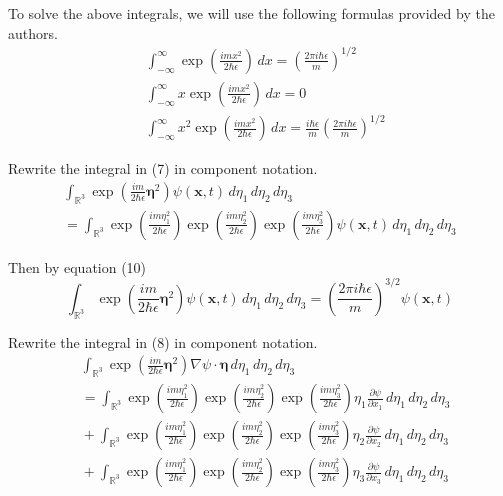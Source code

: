 To solve the above integrals, we will use the following formulas provided by the authors.
\begin{align*}
&\int_{-\infty}^\infty\exp\left(\frac{imx^2}{2\hbar\epsilon}\right)\,dx
=\left(\frac{2\pi i\hbar\epsilon}{m}\right)^{1/2}
\tag{10}
\\
&\int_{-\infty}^\infty x \exp\left(\frac{imx^2}{2\hbar\epsilon}\right)\,dx=0
\tag{11}
\\
&\int_{-\infty}^\infty x^2 \exp\left(\frac{imx^2}{2\hbar\epsilon}\right)\,dx
=\frac{i\hbar\epsilon}{m}\left(\frac{2\pi i\hbar\epsilon}{m}\right)^{1/2}
\tag{12}
\end{align*}

Rewrite the integral in (7) in component notation.
\begin{multline*}
\int_{\mathbb R^3}
\exp\left(\frac{im}{2\hbar\epsilon}\boldsymbol\eta^2\right)
\psi(\mathbf x,t)
\,d\eta_1\,d\eta_2\,d\eta_3
\\
{}=\int_{\mathbb R^3}
\exp\left(\frac{im\eta_1^2}{2\hbar\epsilon}\right)
\exp\left(\frac{im\eta_2^2}{2\hbar\epsilon}\right)
\exp\left(\frac{im\eta_3^2}{2\hbar\epsilon}\right)
\psi(\mathbf x,t)
\,d\eta_1\,d\eta_2\,d\eta_3
\end{multline*}

Then by equation (10)
\begin{equation*}
\int_{\mathbb R^3}
\exp\left(\frac{im}{2\hbar\epsilon}\boldsymbol\eta^2\right)
\psi(\mathbf x,t)
\,d\eta_1\,d\eta_2\,d\eta_3
=\left(\frac{2\pi i\hbar\epsilon}{m}\right)^{3/2}
\psi(\mathbf x,t)
\tag{13}
\end{equation*}

Rewrite the integral in (8) in component notation.
\begin{align*}
&\int_{\mathbb R^3}
\exp\left(\frac{im}{2\hbar\epsilon}\boldsymbol\eta^2\right)
\nabla\psi\cdot\boldsymbol\eta
\,d\eta_1\,d\eta_2\,d\eta_3
\\
&{}=\int_{\mathbb R^3}
\exp\left(\frac{im\eta_1^2}{2\hbar\epsilon}\right)
\exp\left(\frac{im\eta_2^2}{2\hbar\epsilon}\right)
\exp\left(\frac{im\eta_3^2}{2\hbar\epsilon}\right)
\eta_1\frac{\partial\psi}{\partial x_1}
\,d\eta_1\,d\eta_2\,d\eta_3
\\
&{}+\int_{\mathbb R^3}
\exp\left(\frac{im\eta_1^2}{2\hbar\epsilon}\right)
\exp\left(\frac{im\eta_2^2}{2\hbar\epsilon}\right)
\exp\left(\frac{im\eta_3^2}{2\hbar\epsilon}\right)
\eta_2\frac{\partial\psi}{\partial x_2}
\,d\eta_1\,d\eta_2\,d\eta_3
\\
&{}+\int_{\mathbb R^3}
\exp\left(\frac{im\eta_1^2}{2\hbar\epsilon}\right)
\exp\left(\frac{im\eta_2^2}{2\hbar\epsilon}\right)
\exp\left(\frac{im\eta_3^2}{2\hbar\epsilon}\right)
\eta_3\frac{\partial\psi}{\partial x_3}
\,d\eta_1\,d\eta_2\,d\eta_3
\end{align*}

